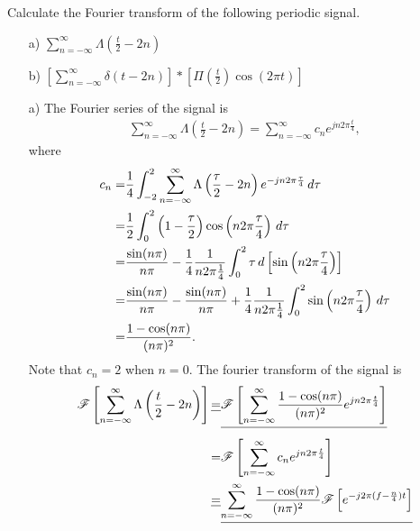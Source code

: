 \documentclass{assignment}
\begin{document}
\begin{prob}[20 pts]
    Calculate the Fourier transform of the following periodic signal.
    \begin{itemize}
        \item[a)] $\sum_{n=-\infty}^{\infty}\Lambda(\frac{t}{2}-2n)$
        \item[b)] $\left[\sum_{n=-\infty}^{\infty}\delta(t-2n)\right]*\left[\Pi(\frac{t}{2})\cos(2\pi t)\right]$
    \end{itemize}
\end{prob}
\begin{sol}
    \begin{itemize}
        \item[a)] The Fourier series of the signal is
        \begin{align}
            \sum_{n=-\infty}^{\infty}\Lambda\left(\frac{t}{2}-2n\right)=\sum_{n=-\infty}^{\infty}c_ne^{jn2\pi\frac{t}{4}},
        \end{align}
        where
        \begin{align}
            \notag c_n=&\frac{1}{4}\int_{-2}^2\sum_{n=-\infty}^{\infty}\Lambda\left(\frac{\tau}{2}-2n\right)e^{-jn2\pi\frac{\tau}{4}}\,d\tau\\
            \notag=&\frac{1}{2}\int_0^2\left(1-\frac{\tau}{2}\right)\cos\left(n2\pi \frac{\tau}{4}\right)\,d\tau\\
            \notag=&\frac{\sin(n\pi)}{n\pi}-\frac{1}{4}\frac{1}{n2\pi\frac{1}{4}}\int_0^2\tau\,d\left[\sin\left(n2\pi\frac{\tau}{4}\right)\right]\\
            \notag=&\frac{\sin(n\pi)}{n\pi}-\frac{\sin(n\pi)}{n\pi}+\frac{1}{4}\frac{1}{n2\pi\frac{1}{4}}\int_0^2\sin\left(n2\pi\frac{\tau}{4}\right)\,d\tau\\
            =&\frac{1-\cos(n\pi)}{(n\pi)^2}.
        \end{align}
        Note that $c_n=2$ when $n=0$.
        The fourier transform of the signal is
        \begin{align}
            \notag\mathscr{F}\left[\sum_{n=-\infty}^{\infty}\Lambda\left(\frac{t}{2}-2n\right)\right]\sout{=}&\sout{\mathscr{F}\left[\sum_{n=-\infty}^{\infty}\frac{1-\cos(n\pi)}{(n\pi)^2}e^{jn2\pi\frac{t}{4}}\right]}\\
            \notag=&\mathscr{F}\left[\sum_{n=-\infty}^{\infty}c_ne^{jn2\pi\frac{t}{4}}\right]\\
            \notag\sout{=}&\sout{\sum_{n=-\infty}^{\infty}\frac{1-\cos(n\pi)}{(n\pi)^2}\mathscr{F}\left[e^{-j2\pi(f-\frac{n}{4})t}\right]}\\

\end{align}
\end{itemize}
\end{sol}
\end{document}
